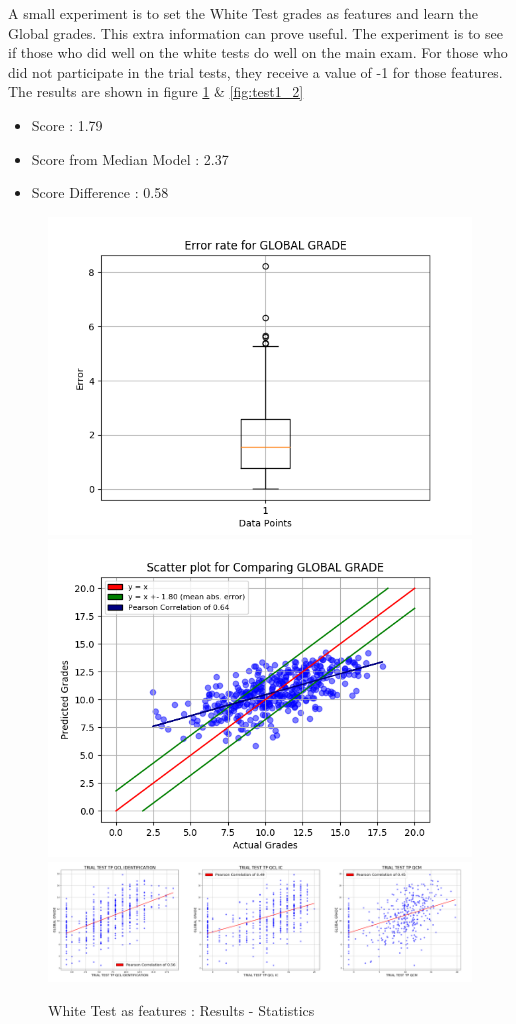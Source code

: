 \documentclass[a4paper,11pt]{report}
\numberwithin{figure}{chapter} %
\begin{document}
    A small experiment is to set the White Test grades as features and learn the Global grades.
    This extra information can prove useful.
    The experiment is to see if those who did well on the white tests do well on the main exam.
    For those who did not participate in the trial tests, they receive a value of -1 for those features.
    The results are shown in figure \ref{fig:test1_1} \& \ref{fig:test1_2}
    \begin{itemize}
        \item[\textbullet] Score : 1.79
        \item[\textbullet] Score from Median Model : 2.37
        \item[\textbullet] Score Difference : 0.58
    \end{itemize}
      \begin{figure}[H]
      \centering
      \includegraphics[width=.40\linewidth]{plots/test1_cv_boxplot_GLOBAL_GRADE_2018-05-17_20_39_42.png}
      \includegraphics[width=.40\linewidth]{plots/test1_cv_comp_GLOBAL_GRADE_2018-05-17_20_39_42.png}\\
      \includegraphics[width=.99\linewidth]{plots/test1_var_correlation_GLOBAL_GRADE_2018-05-17_10_12_19.png}
      \caption{White Test as features : Results - Statistics}
      \label{fig:test1_1}
      \end{figure}
\end{document}

